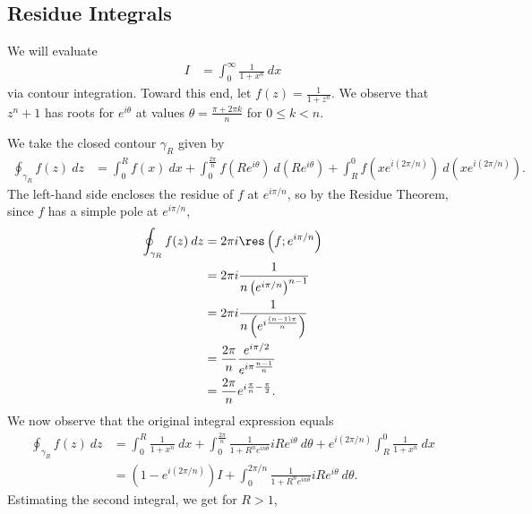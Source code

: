 \documentclass[10pt]{mypackage}
\begin{document}
\subsection{Residue Integrals}%
\begin{example}
  We will evaluate
  \begin{align*}
    I &= \int_{0}^{\infty} \frac{1}{1 + x^{n}}\:dx
  \end{align*}
  via contour integration. Toward this end, let $f(z) = \frac{1}{1 + z^{n}}$. We observe that $z^{n} + 1$ has roots for $e^{i\theta}$ at values $\theta = \frac{\pi + 2\pi k}{n}$ for $0\leq k < n$.%

  We take the closed contour $\gamma_R$ given by
  \begin{align*}
    \oint_{\gamma_R}^{} f(z)\:dz &= \int_{0}^{R} f(x)\:dx + \int_{0}^{\frac{2\pi}{n}} f\left( Re^{i\theta} \right)\:d\left( Re^{i\theta} \right) + \int_{R}^{0} f\left( xe^{i\left( 2\pi/n \right)} \right)\:d\left( xe^{i\left( 2\pi/n \right)} \right).
  \end{align*}
  The left-hand side encloses the residue of $f$ at $e^{i\pi/n}$, so by the Residue Theorem, since $f$ has a simple pole at $e^{i\pi/n}$,
  \begin{align*}
    \oint_{\gamma_R}^{} f(z)\:dz &= 2\pi i \res\left( f;e^{i\pi/n} \right)\\
                                 &= 2\pi i \frac{1}{n\left( e^{i\pi/n} \right)^{n-1}}\\
                                 &= 2\pi i \frac{1}{n\left( e^{i\frac{\left( n-1 \right)\pi}{n}} \right)}\\
                                 &= \frac{2\pi}{n} \frac{e^{i\pi/2}}{e^{i\pi\frac{n-1}{n}}}\\
                                 &= \frac{2\pi}{n} e^{i\frac{\pi}{n} - \frac{\pi}{2}}.
  \end{align*}
  We now observe that the original integral expression equals
  \begin{align*}
    \oint_{\gamma_R}^{} f(z)\:dz &= \int_{0}^{R} \frac{1}{1 + x^{n}}\:dx + \int_{0}^{\frac{2\pi}{n}} \frac{1}{1 + R^{n}e^{in\theta}}iRe^{i\theta}\:d\theta + e^{i\left( 2\pi/n \right)}\int_{R}^{0} \frac{1}{1 + x^{n}}\:dx\\
                                 &= \left( 1-e^{i\left( 2\pi/n \right)} \right) I + \int_{0}^{2\pi/n} \frac{1}{1 + R^{n}e^{in\theta}}iRe^{i\theta}\:d\theta.
  \end{align*}
  Estimating the second integral, we get for $R > 1$,

\end{example}
\end{document}
